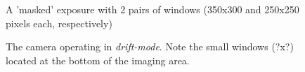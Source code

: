 \begin{figure}  
  \centering
  \setlength{\fboxsep}{0pt}
  \setlength{\fboxrule}{1pt}
  \caption{A 'masked' exposure with 2 pairs of windows (350x300 and 250x250 pixels each, respectively)}
  \label{fig:V713Cep}
\end{figure}

\begin{figure}  
  \centering
  \setlength{\fboxsep}{0pt}
  \setlength{\fboxrule}{1pt}
  \caption{The camera operating in \emph{drift-mode}. Note the small windows (?x?) located at the bottom of the imaging area. }
  \label{fig:V713Cep}
\end{figure}


